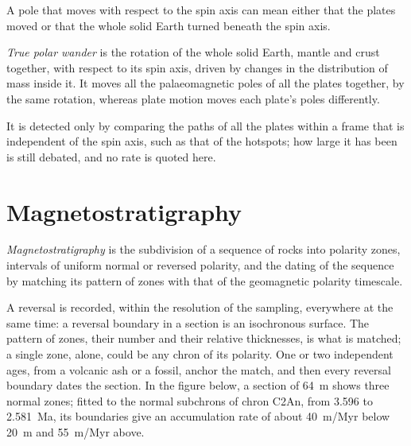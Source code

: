 A pole that moves with respect to the spin axis can mean either that the plates
moved or that the whole solid Earth turned beneath the spin axis.

\begin{definition}\label{def:b3:palaeomagnetism:tpw}
\emph{True polar wander} is the rotation of the whole
solid Earth, mantle and crust together, with respect to its spin axis, driven
by changes in the distribution of mass inside it. It moves all the
palaeomagnetic poles of all the plates together, by the same rotation, whereas
plate motion moves each plate's poles differently.
\end{definition}

It is detected only by comparing the paths of all the plates within a frame
that is independent of the spin axis, such as that of the hotspots; how large
it has been is still debated, and no rate is quoted here.

\section{Magnetostratigraphy}

\begin{definition}[Magnetostratigraphy]\label{def:b3:palaeomagnetism:magnetostratigraphy}
\emph{Magnetostratigraphy} is the subdivision of a
sequence of rocks into polarity zones, intervals of uniform normal or reversed
polarity, and the dating of the sequence by matching its pattern of zones with
that of the geomagnetic polarity timescale.
\end{definition}

A reversal is recorded, within the resolution of the sampling, everywhere at
the same time: a reversal boundary in a section is an isochronous surface.
The pattern of zones, their number and their relative thicknesses, is what is
matched; a single zone, alone, could be any chron of its polarity. One or two
independent ages, from a volcanic ash or a fossil, anchor the match, and then
every reversal boundary dates the section. In the figure below, a section of
\qty{64}{m} shows three normal zones; fitted to the normal subchrons of
chron C2An, from 3.596 to \qty{2.581}{Ma}, its boundaries give an accumulation
rate of about \qty{40}{m/Myr} below \qty{20}{m} and \qty{55}{m/Myr} above.

